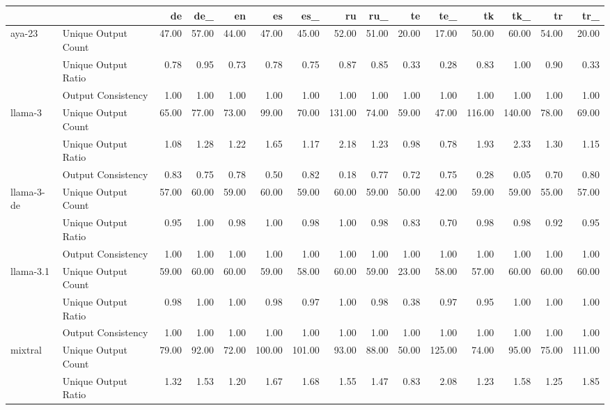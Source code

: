 \begin{tabular}{llrrrrrrrrrrrrr}
\toprule
 &  & de & de_ & en & es & es_ & ru & ru_ & te & te_ & tk & tk_ & tr & tr_ \\
\midrule
\multirow[t]{3}{*}{aya-23} & Unique Output Count & 47.00 & 57.00 & 44.00 & 47.00 & 45.00 & 52.00 & 51.00 & 20.00 & 17.00 & 50.00 & 60.00 & 54.00 & 20.00 \\
 & Unique Output Ratio & 0.78 & 0.95 & 0.73 & 0.78 & 0.75 & 0.87 & 0.85 & 0.33 & 0.28 & 0.83 & 1.00 & 0.90 & 0.33 \\
 & Output Consistency & 1.00 & 1.00 & 1.00 & 1.00 & 1.00 & 1.00 & 1.00 & 1.00 & 1.00 & 1.00 & 1.00 & 1.00 & 1.00 \\
\cline{1-15}
\multirow[t]{3}{*}{llama-3} & Unique Output Count & 65.00 & 77.00 & 73.00 & 99.00 & 70.00 & 131.00 & 74.00 & 59.00 & 47.00 & 116.00 & 140.00 & 78.00 & 69.00 \\
 & Unique Output Ratio & 1.08 & 1.28 & 1.22 & 1.65 & 1.17 & 2.18 & 1.23 & 0.98 & 0.78 & 1.93 & 2.33 & 1.30 & 1.15 \\
 & Output Consistency & 0.83 & 0.75 & 0.78 & 0.50 & 0.82 & 0.18 & 0.77 & 0.72 & 0.75 & 0.28 & 0.05 & 0.70 & 0.80 \\
\cline{1-15}
\multirow[t]{3}{*}{llama-3-de} & Unique Output Count & 57.00 & 60.00 & 59.00 & 60.00 & 59.00 & 60.00 & 59.00 & 50.00 & 42.00 & 59.00 & 59.00 & 55.00 & 57.00 \\
 & Unique Output Ratio & 0.95 & 1.00 & 0.98 & 1.00 & 0.98 & 1.00 & 0.98 & 0.83 & 0.70 & 0.98 & 0.98 & 0.92 & 0.95 \\
 & Output Consistency & 1.00 & 1.00 & 1.00 & 1.00 & 1.00 & 1.00 & 1.00 & 1.00 & 1.00 & 1.00 & 1.00 & 1.00 & 1.00 \\
\cline{1-15}
\multirow[t]{3}{*}{llama-3.1} & Unique Output Count & 59.00 & 60.00 & 60.00 & 59.00 & 58.00 & 60.00 & 59.00 & 23.00 & 58.00 & 57.00 & 60.00 & 60.00 & 60.00 \\
 & Unique Output Ratio & 0.98 & 1.00 & 1.00 & 0.98 & 0.97 & 1.00 & 0.98 & 0.38 & 0.97 & 0.95 & 1.00 & 1.00 & 1.00 \\
 & Output Consistency & 1.00 & 1.00 & 1.00 & 1.00 & 1.00 & 1.00 & 1.00 & 1.00 & 1.00 & 1.00 & 1.00 & 1.00 & 1.00 \\
\cline{1-15}
\multirow[t]{3}{*}{mixtral} & Unique Output Count & 79.00 & 92.00 & 72.00 & 100.00 & 101.00 & 93.00 & 88.00 & 50.00 & 125.00 & 74.00 & 95.00 & 75.00 & 111.00 \\
 & Unique Output Ratio & 1.32 & 1.53 & 1.20 & 1.67 & 1.68 & 1.55 & 1.47 & 0.83 & 2.08 & 1.23 & 1.58 & 1.25 & 1.85 \\

\end{tabular}
